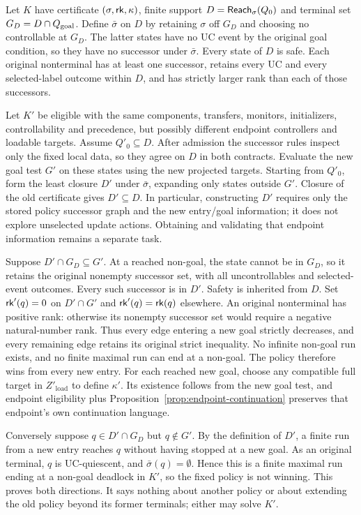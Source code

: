 Let $K$ have certificate $(\sigma,\mathsf{rk},\kappa)$, finite support $D=\mathsf{Reach}_\sigma(Q_0)$ and terminal set $G_D=D\cap Q_{\mathrm{goal}}$. Define $\bar\sigma$ on $D$ by retaining $\sigma$ off $G_D$ and choosing no controllable at $G_D$. The latter states have no UC event by the original goal condition, so they have no successor under $\bar\sigma$. Every state of $D$ is safe. Each original nonterminal has at least one successor, retains every UC and every selected-label outcome within $D$, and has strictly larger rank than each of those successors.

Let $K'$ be eligible with the same components, transfers, monitors, initializers, controllability and precedence, but possibly different endpoint controllers and loadable targets. Assume $Q'_0\subseteq D$. After admission the successor rules inspect only the fixed local data, so they agree on $D$ in both contracts. Evaluate the new goal test $G'$ on these states using the new projected targets. Starting from $Q'_0$, form the least closure $D'$ under $\bar\sigma$, expanding only states outside $G'$. Closure of the old certificate gives $D'\subseteq D$. In particular, constructing $D'$ requires only the stored policy successor graph and the new entry/goal information; it does not explore unselected update actions. Obtaining and validating that endpoint information remains a separate task.

Suppose $D'\cap G_D\subseteq G'$. At a reached non-goal, the state cannot be in $G_D$, so it retains the original nonempty successor set, with all uncontrollables and selected-event outcomes. Every such successor is in $D'$. Safety is inherited from $D$. Set $\mathsf{rk}'(q)=0$ on $D'\cap G'$ and $\mathsf{rk}'(q)=\mathsf{rk}(q)$ elsewhere. An original nonterminal has positive rank: otherwise its nonempty successor set would require a negative natural-number rank. Thus every edge entering a new goal strictly decreases, and every remaining edge retains its original strict inequality. No infinite non-goal run exists, and no finite maximal run can end at a non-goal. The policy therefore wins from every new entry. For each reached new goal, choose any compatible full target in $Z'_{\mathrm{load}}$ to define $\kappa'$. Its existence follows from the new goal test, and endpoint eligibility plus Proposition~\ref{prop:endpoint-continuation} preserves that endpoint's own continuation language.

Conversely suppose $q\in D'\cap G_D$ but $q\notin G'$. By the definition of $D'$, a finite run from a new entry reaches $q$ without having stopped at a new goal. As an original terminal, $q$ is UC-quiescent, and $\bar\sigma(q)=\emptyset$. Hence this is a finite maximal run ending at a non-goal deadlock in $K'$, so the fixed policy is not winning. This proves both directions. It says nothing about another policy or about extending the old policy beyond its former terminals; either may solve $K'$.

